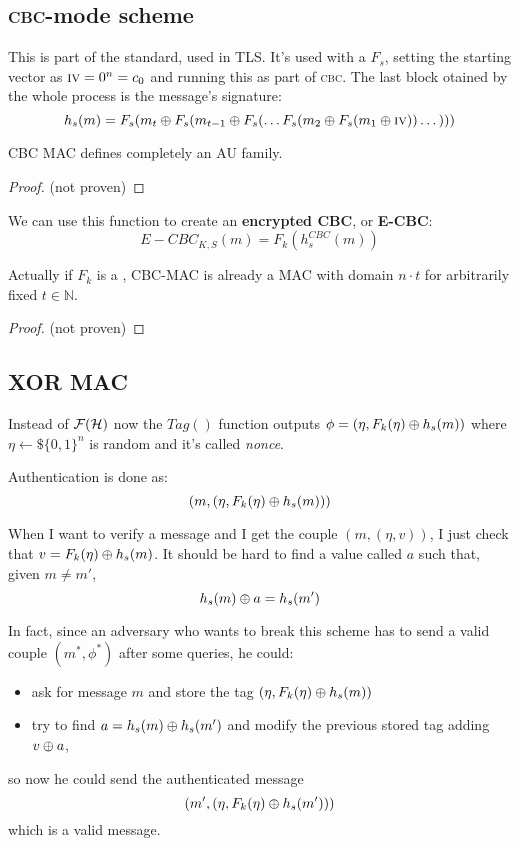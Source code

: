 \subsection{\textsc{cbc}-mode \mac{} scheme}
This is part of the standard, used in TLS. It's used with a \prf{} $F_{s}$, setting the starting vector as $\textsc{iv} = 0^n = c_0$ and running this \prf{} as part of \textsc{cbc}. The last block otained by the whole process is the message's signature:
\[
    h_s(m) = F_s(m_t \oplus F_s(m_{t-1} \oplus F_s(\dots F_s(m_2 \oplus F_s(m_1 \oplus \textsc{iv})) \dots)))
\]
\begin{lemma}
    CBC MAC defines completely an AU family.
\end{lemma}

\begin{proof}
    (not proven)
\end{proof}

We can use this function to create an \textbf{encrypted CBC}, or \textbf{E-CBC}:
\[
    E-CBC_{K, S}(m)=F_{k}(h_{s}^{CBC}(m))
\]

\begin{theorem}
    Actually if $F_k$ is a \prf, CBC-MAC is already a MAC with domain $n\cdot t$ for arbitrarily fixed $t \in \mathbb{N}$.
\end{theorem}

\begin{proof}
    (not proven)
\end{proof}

\subsection{XOR MAC}
Instead of $\mathcal{F}(\mathcal{H})$ now the $Tag()$ function outputs $\phi = (\eta , F_{k}(\eta) \oplus h_{s}(m))$ where $\eta \leftarrow\$ \{0,1\}^{n}$ is random and it's called \textit{nonce}.

Authentication is done as:
\[
    (m,( \eta, F_{k}(\eta)\oplus h_{s}(m)))
\]

When I want to verify a message and I get the couple $(m, (\eta, v))$, I just check that $v=F_{k}(\eta) \oplus h_{s}(m)$. It should be hard to find a value called $a$ such that, given $m \not= m'$, 
\[
    h_{s}(m) \oplus a= h_{s}(m')
\]

In fact, since an adversary who wants to break this scheme has to send a valid couple $(m^{*}, \phi^{*})$ after some queries, he could:
\begin{itemize}
    \item ask for message $m$ and store the tag $( \eta, F_{k}(\eta)\oplus h_{s}(m))$
    \item try to find $a=h_{s}(m) \oplus h_{s}(m')$ and modify the previous stored tag adding $v \oplus a$, 
\end{itemize}
so now he could send the authenticated message
\[
    (m', (\eta, F_{k}(\eta) \oplus h_{s}(m'))) 
\]
which is a valid message.

